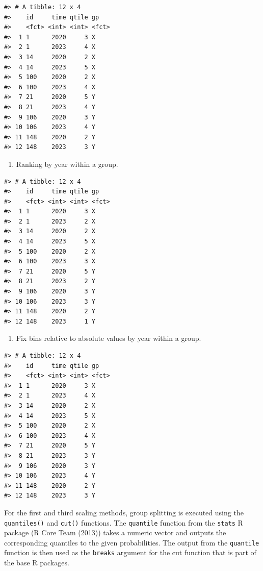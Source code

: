 \begin{verbatim}
#> # A tibble: 12 x 4
#>    id     time qtile gp   
#>    <fct> <int> <int> <fct>
#>  1 1      2020     3 X    
#>  2 1      2023     4 X    
#>  3 14     2020     2 X    
#>  4 14     2023     5 X    
#>  5 100    2020     2 X    
#>  6 100    2023     4 X    
#>  7 21     2020     5 Y    
#>  8 21     2023     4 Y    
#>  9 106    2020     3 Y    
#> 10 106    2023     4 Y    
#> 11 148    2020     2 Y    
#> 12 148    2023     3 Y
\end{verbatim}

\begin{enumerate}
\def\labelenumi{\arabic{enumi}.}
\setcounter{enumi}{2}
\tightlist
\item
  Ranking by year within a group.
\end{enumerate}

\begin{verbatim}
#> # A tibble: 12 x 4
#>    id     time qtile gp   
#>    <fct> <int> <int> <fct>
#>  1 1      2020     3 X    
#>  2 1      2023     2 X    
#>  3 14     2020     2 X    
#>  4 14     2023     5 X    
#>  5 100    2020     2 X    
#>  6 100    2023     3 X    
#>  7 21     2020     5 Y    
#>  8 21     2023     2 Y    
#>  9 106    2020     3 Y    
#> 10 106    2023     3 Y    
#> 11 148    2020     2 Y    
#> 12 148    2023     1 Y
\end{verbatim}

\begin{enumerate}
\def\labelenumi{\arabic{enumi}.}
\setcounter{enumi}{3}
\tightlist
\item
  Fix bins relative to absolute values by year within a group.
\end{enumerate}

\begin{verbatim}
#> # A tibble: 12 x 4
#>    id     time qtile gp   
#>    <fct> <int> <int> <fct>
#>  1 1      2020     3 X    
#>  2 1      2023     4 X    
#>  3 14     2020     2 X    
#>  4 14     2023     5 X    
#>  5 100    2020     2 X    
#>  6 100    2023     4 X    
#>  7 21     2020     5 Y    
#>  8 21     2023     3 Y    
#>  9 106    2020     3 Y    
#> 10 106    2023     4 Y    
#> 11 148    2020     2 Y    
#> 12 148    2023     3 Y
\end{verbatim}

For the first and third scaling methods, group splitting is executed using the \texttt{quantiles()} and \texttt{cut()} functions. The \texttt{quantile} function from the \texttt{stats} R package (R Core Team (2013)) takes a numeric vector and outputs the corresponding quantiles to the given probabilities. The output from the \texttt{quantile} function is then used as the \texttt{breaks} argument for the cut function that is part of the base R packages.

